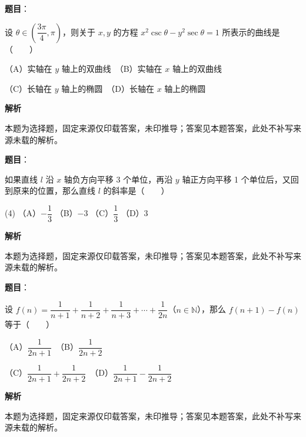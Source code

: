 \begin{answer}

\textbf{题目}：

设 $\theta\in\left(\dfrac{3\pi}{4},\pi\right)$，则关于 $x,y$ 的方程 $x^2\csc\theta-y^2\sec\theta=1$ 所表示的曲线是\mbox{（　　）}

（A）实轴在 $y$ 轴上的双曲线　（B）实轴在 $x$ 轴上的双曲线

（C）长轴在 $y$ 轴上的椭圆　（D）长轴在 $x$ 轴上的椭圆

\textbf{解析}

本题为选择题，固定来源仅印载答案，未印推导；答案见本题答案，此处不补写来源未载的解析。


\end{answer}
\begin{answer}

\textbf{题目}：

如果直线 $l$ 沿 $x$ 轴负方向平移 3 个单位，再沿 $y$ 轴正方向平移 1 个单位后，又回到原来的位置，那么直线 $l$ 的斜率是\mbox{（　　）}

\begin{gkopts}(4)
\task （A）$-\dfrac13$
\task （B）$-3$
\task （C）$\dfrac13$
\task （D）$3$
\end{gkopts}

\textbf{解析}

本题为选择题，固定来源仅印载答案，未印推导；答案见本题答案，此处不补写来源未载的解析。


\end{answer}
\begin{answer}

\textbf{题目}：

设 $f(n)=\dfrac1{n+1}+\dfrac1{n+2}+\dfrac1{n+3}+\cdots+\dfrac1{2n}$（$n\in\mathbb N$），那么 $f(n+1)-f(n)$ 等于\mbox{（　　）}

（A）$\dfrac1{2n+1}$　（B）$\dfrac1{2n+2}$

（C）$\dfrac1{2n+1}+\dfrac1{2n+2}$　（D）$\dfrac1{2n+1}-\dfrac1{2n+2}$

\textbf{解析}

本题为选择题，固定来源仅印载答案，未印推导；答案见本题答案，此处不补写来源未载的解析。


\end{answer}
